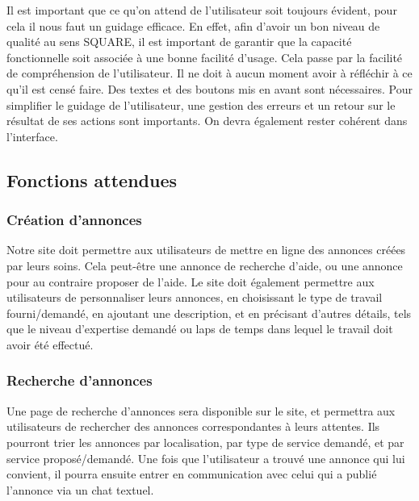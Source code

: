 \documentclass[a4paper,11pt]{article}
\begin{document}
Il est important que ce qu’on attend de l’utilisateur soit toujours évident, pour cela il nous faut un
guidage efficace. En effet, afin d’avoir un bon niveau de qualité au sens SQUARE, il est important de
garantir que la capacité fonctionnelle soit associée à une bonne facilité d’usage. Cela passe par la
facilité de compréhension de l’utilisateur. Il ne doit à aucun moment avoir à réfléchir à ce qu’il est
censé faire. Des textes et des boutons mis en avant sont nécessaires. Pour simplifier le guidage de
l’utilisateur, une gestion des erreurs et un retour sur le résultat de ses actions sont importants. On
devra également rester cohérent dans l’interface.\\


\subsection{Fonctions attendues}

\subsubsection{Création d’annonces}

Notre site doit permettre aux utilisateurs de mettre en ligne des annonces créées par leurs soins. Cela
peut-être une annonce de recherche d’aide, ou une annonce pour au contraire proposer de l’aide. Le
site doit également permettre aux utilisateurs de personnaliser leurs annonces, en choisissant le type
de travail fourni/demandé, en ajoutant une description, et en précisant d’autres détails, tels que le
niveau d’expertise demandé ou laps de temps dans lequel le travail doit avoir été effectué.\\

\subsubsection{Recherche d’annonces}

Une page de recherche d’annonces sera disponible sur le site, et permettra aux utilisateurs de
rechercher des annonces correspondantes à leurs attentes. Ils pourront trier les annonces par
localisation, par type de service demandé, et par service proposé/demandé. Une fois que l’utilisateur
a trouvé une annonce qui lui convient, il pourra ensuite entrer en communication avec celui qui a
publié l’annonce via un chat textuel.\\
\end{document}

